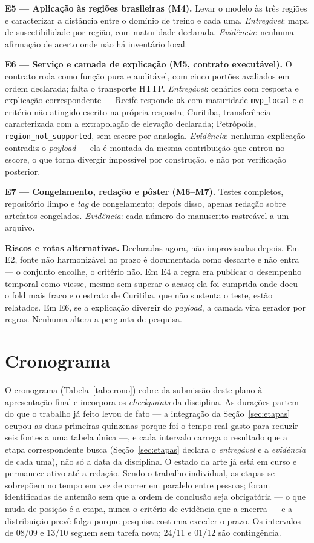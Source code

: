 \documentclass[conference]{IEEEtran}
\begin{document}
\textbf{E5 --- Aplicação às regiões brasileiras (M4).} Levar o modelo às três
regiões e caracterizar a distância entre o domínio de treino e cada uma.
\emph{Entregável}: mapa de suscetibilidade por região, com maturidade declarada.
\emph{Evidência}: nenhuma afirmação de acerto onde não há inventário local.

\textbf{E6 --- Serviço e camada de explicação (M5, contrato executável).} O
contrato roda como função pura e auditável, com cinco portões avaliados em ordem
declarada; falta o transporte HTTP. \emph{Entregável}: cenários com resposta e
explicação correspondente --- Recife responde \texttt{ok} com maturidade
\texttt{mvp\_local} e o critério não atingido escrito na própria resposta;
Curitiba, transferência caracterizada com a extrapolação de elevação declarada;
Petrópolis, \texttt{region\_not\_supported}, sem escore por analogia.
\emph{Evidência}: nenhuma explicação contradiz o \emph{payload} --- ela é montada
da mesma contribuição que entrou no escore, o que torna divergir impossível por
construção, e não por verificação posterior.

\textbf{E7 --- Congelamento, redação e pôster (M6--M7).} Testes completos,
repositório limpo e \emph{tag} de congelamento; depois disso, apenas redação
sobre artefatos congelados. \emph{Evidência}: cada número do manuscrito
rastreável a um arquivo.

\textbf{Riscos e rotas alternativas.} Declaradas agora, não improvisadas depois.
Em E2, fonte não harmonizável no prazo é documentada como descarte e não entra ---
o conjunto encolhe, o critério não. Em E4 a regra era publicar o desempenho
temporal como viesse, mesmo sem superar o acaso; ela foi cumprida onde doeu ---
o fold mais fraco e o estrato de Curitiba, que não sustenta o teste, estão
relatados. Em E6, se a explicação divergir do
\emph{payload}, a camada vira gerador por regras. Nenhuma altera a pergunta de
pesquisa.

\section{Cronograma}
\label{sec:crono}

O cronograma (Tabela~\ref{tab:crono}) cobre da submissão deste plano à
apresentação final e incorpora os \emph{checkpoints} da disciplina. As
durações partem do que o trabalho já feito levou de fato --- a integração da
Seção~\ref{sec:etapas} ocupou as duas primeiras quinzenas porque foi o tempo
real gasto para reduzir seis fontes a uma tabela única ---, e cada intervalo
carrega o resultado que a etapa correspondente busca (Seção~\ref{sec:etapas}
declara o \emph{entregável} e a \emph{evidência} de cada uma), não só a data
da disciplina. O estado da
arte já está em curso e permanece ativo até a redação. Sendo o trabalho
individual, as etapas se sobrepõem no tempo em vez de correr em paralelo entre
pessoas; foram identificadas de antemão sem que a ordem de conclusão seja
obrigatória --- o que muda de posição é a etapa, nunca o critério de evidência
que a encerra --- e a distribuição prevê folga porque pesquisa costuma exceder o
prazo. Os intervalos de 08/09 e 13/10 seguem sem tarefa nova; 24/11 e 01/12 são
contingência.
\end{document}
